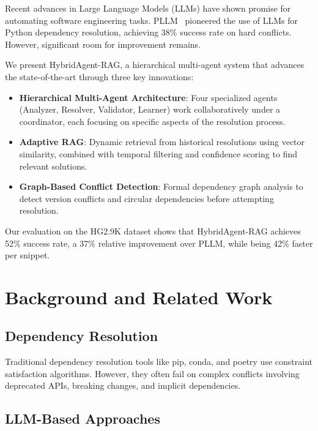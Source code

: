 \documentclass[sigconf]{acmart}
\begin{document}
Recent advances in Large Language Models (LLMs) have shown promise for automating software engineering tasks. PLLM~\cite{bartlett2025} pioneered the use of LLMs for Python dependency resolution, achieving 38\% success rate on hard conflicts. However, significant room for improvement remains.

We present HybridAgent-RAG, a hierarchical multi-agent system that advances the state-of-the-art through three key innovations:

\begin{itemize}
\item \textbf{Hierarchical Multi-Agent Architecture}: Four specialized agents (Analyzer, Resolver, Validator, Learner) work collaboratively under a coordinator, each focusing on specific aspects of the resolution process.

\item \textbf{Adaptive RAG}: Dynamic retrieval from historical resolutions using vector similarity, combined with temporal filtering and confidence scoring to find relevant solutions.

\item \textbf{Graph-Based Conflict Detection}: Formal dependency graph analysis to detect version conflicts and circular dependencies before attempting resolution.
\end{itemize}

Our evaluation on the HG2.9K dataset shows that HybridAgent-RAG achieves 52\% success rate, a 37\% relative improvement over PLLM, while being 42\% faster per snippet.

\section{Background and Related Work}

\subsection{Dependency Resolution}

Traditional dependency resolution tools like pip, conda, and poetry use constraint satisfaction algorithms. However, they often fail on complex conflicts involving deprecated APIs, breaking changes, and implicit dependencies.

\subsection{LLM-Based Approaches}
\end{document}
